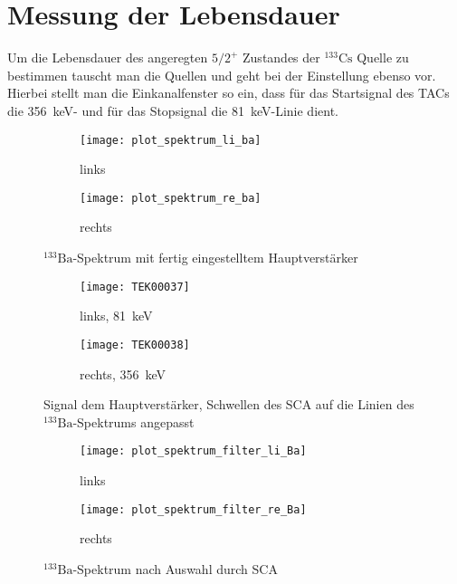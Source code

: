\documentclass[11pt, ngerman, fleqn, DIV=15, headinclude, BCOR=2cm]{scrreprt}
\begin{document}
\clearpage
\section{Messung der Lebensdauer}
Um die Lebensdauer des angeregten $5/2^+$ Zustandes der $^{133}\text{Cs}$
Quelle zu bestimmen tauscht man die Quellen und geht bei der Einstellung ebenso
vor. Hierbei stellt man die Einkanalfenster so ein, dass für das Startsignal
des TACs die \SI{356}{\kilo\electronvolt}- und für das Stopsignal
die \SI{81}{\kilo\electronvolt}-Linie dient.

\begin{figure}
	\centering
	\begin{subfigure}{0.49 \textwidth}
		\texttt{[image: plot\_spektrum\_li\_ba]}
		\caption{%
			links
		}
		\label{fig:ba_slow_hv_eingestellt-li_plot}
	\end{subfigure}
	\begin{subfigure}{0.49 \textwidth}
		\texttt{[image: plot\_spektrum\_re\_ba]}
		\caption{%
			rechts
		}
		\label{fig:ba_slow_hv_eingestellt-re_plot}
	\end{subfigure}
	\caption{%
		$^{133}\text{Ba}$-Spektrum mit fertig eingestelltem
		Hauptverstärker
	}
	\label{fig:ba_slow_signal_hv_eingestellt_plot}
\end{figure}

\begin{figure}
	\centering
	\begin{subfigure}{0.49 \textwidth}
		\texttt{[image: TEK00037]}
		\caption{%
			links, \SI{81}{\kilo\electronvolt}
		}
		\label{fig:ba_slow_signal_sca_eingestellt-li}
	\end{subfigure}
	\begin{subfigure}{0.49 \textwidth}
		\texttt{[image: TEK00038]}
		\caption{%
			rechts, \SI{356}{\kilo\electronvolt}
		}
		\label{fig:ba_slow_signal_sca_eingestellt-re}
	\end{subfigure}
	\caption{%
		Signal dem Hauptverstärker, Schwellen des SCA auf die Linien
		des $^{133}\text{Ba}$-Spektrums angepasst
	}
	\label{fig:ba_slow_signal_sca_eingestellt}
\end{figure}

\begin{figure}
	\centering
	\begin{subfigure}{0.49 \textwidth}
		\texttt{[image: plot\_spektrum\_filter\_li\_Ba]}
		\caption{%
			links
		}
		\label{fig:ba_slow_sca_eingestellt-li_plot}
	\end{subfigure}
	\begin{subfigure}{0.49 \textwidth}
		\texttt{[image: plot\_spektrum\_filter\_re\_Ba]}
		\caption{%
			rechts
		}
		\label{fig:ba_slow_sca_eingestellt-re_plot}
	\end{subfigure}
	\caption{%
		$^{133}\text{Ba}$-Spektrum nach Auswahl durch SCA
	}
	\label{fig:ba_slow_signal_sca_eingestellt_plot}
\end{figure}
\end{document}
